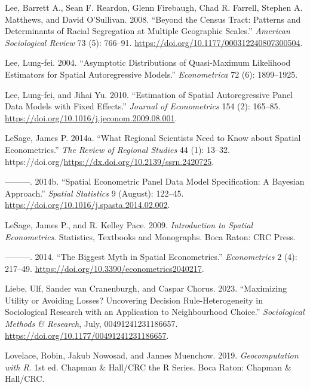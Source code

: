 \documentclass[
  letterpaper,
  DIV=11,
  numbers=noendperiod]{scrreprt}
\newlength{\cslhangindent}
\newlength{\cslentryspacingunit} %
\newenvironment{CSLReferences}[2] %
 {%
  \setlength{\parindent}{0pt}
  \ifodd #1
  \let\oldpar\par
  \def\par{\hangindent=\cslhangindent\oldpar}
  \fi
  \setlength{\parskip}{#2\cslentryspacingunit}
 }%
 {}
\begin{document}
\begin{CSLReferences}{1}{0}
\leavevmode{}%
Lee, Barrett A., Sean F. Reardon, Glenn Firebaugh, Chad R. Farrell,
Stephen A. Matthews, and David O'Sullivan. 2008. {``Beyond the {Census
Tract}: {Patterns} and {Determinants} of {Racial Segregation} at
{Multiple Geographic Scales}.''} \emph{American Sociological Review} 73
(5): 766--91. \url{https://doi.org/10.1177/000312240807300504}.

\leavevmode{}%
Lee, Lung-fei. 2004. {``Asymptotic {Distributions} of {Quasi-Maximum
Likelihood Estimators} for {Spatial Autoregressive Models}.''}
\emph{Econometrica} 72 (6): 1899--1925.

\leavevmode{}%
Lee, Lung-fei, and Jihai Yu. 2010. {``Estimation of {Spatial
Autoregressive Panel Data Models} with {Fixed Effects}.''} \emph{Journal
of Econometrics} 154 (2): 165--85.
\url{https://doi.org/10.1016/j.jeconom.2009.08.001}.

\leavevmode{}%
LeSage, James P. 2014a. {``What {Regional Scientists Need} to {Know}
about {Spatial Econometrics}.''} \emph{The Review of Regional Studies}
44 (1): 13--32.
https://doi.org/\url{https://dx.doi.org/10.2139/ssrn.2420725}.

\leavevmode{}%
---------. 2014b. {``Spatial Econometric Panel Data Model Specification:
{A Bayesian} Approach.''} \emph{Spatial Statistics} 9 (August): 122--45.
\url{https://doi.org/10.1016/j.spasta.2014.02.002}.

\leavevmode{}%
LeSage, James P., and R. Kelley Pace. 2009. \emph{Introduction to
{Spatial Econometrics}}. Statistics, {Textbooks} and {Monographs}. {Boca
Raton}: {CRC Press}.

\leavevmode{}%
---------. 2014. {``The {Biggest Myth} in {Spatial Econometrics}.''}
\emph{Econometrics} 2 (4): 217--49.
\url{https://doi.org/10.3390/econometrics2040217}.

\leavevmode{}%
Liebe, Ulf, Sander van Cranenburgh, and Caspar Chorus. 2023.
{``Maximizing {Utility} or {Avoiding Losses}? {Uncovering Decision
Rule-Heterogeneity} in {Sociological Research} with an {Application} to
{Neighbourhood Choice}.''} \emph{Sociological Methods \& Research},
July, 00491241231186657.
\url{https://doi.org/10.1177/00491241231186657}.

\leavevmode{}%
Lovelace, Robin, Jakub Nowosad, and Jannes Muenchow. 2019.
\emph{Geocomputation with {R}}. 1st ed. Chapman \& {Hall}/{CRC} the {R}
Series. {Boca Raton}: {Chapman \& Hall/CRC}.


\end{CSLReferences}
\end{document}
